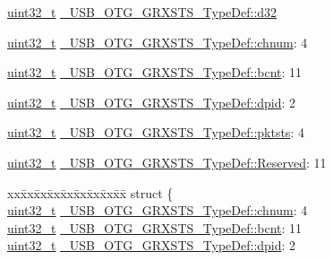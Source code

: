 \begin{DoxyCompactItemize}
\begin{tabbing}
\end{tabbing}\item 
\hyperlink{stdint_8h_a435d1572bf3f880d55459d9805097f62}{uint32\-\_\-t} \hyperlink{group___u_s_b___o_t_g___d_r_i_v_e_r_gab071a096d316aba8721b227e86994e8d}{\-\_\-\-U\-S\-B\-\_\-\-O\-T\-G\-\_\-\-G\-R\-X\-S\-T\-S\-\_\-\-Type\-Def\-::d32}
\item 
\hyperlink{stdint_8h_a435d1572bf3f880d55459d9805097f62}{uint32\-\_\-t} \hyperlink{group___u_s_b___o_t_g___d_r_i_v_e_r_gad13bf9b9a5b51b6001dc3b898a936845}{\-\_\-\-U\-S\-B\-\_\-\-O\-T\-G\-\_\-\-G\-R\-X\-S\-T\-S\-\_\-\-Type\-Def\-::chnum}\-: 4
\item 
\hyperlink{stdint_8h_a435d1572bf3f880d55459d9805097f62}{uint32\-\_\-t} \hyperlink{group___u_s_b___o_t_g___d_r_i_v_e_r_gaf3069e9e6cdea3892dc19c9b53f539a6}{\-\_\-\-U\-S\-B\-\_\-\-O\-T\-G\-\_\-\-G\-R\-X\-S\-T\-S\-\_\-\-Type\-Def\-::bcnt}\-: 11
\item 
\hyperlink{stdint_8h_a435d1572bf3f880d55459d9805097f62}{uint32\-\_\-t} \hyperlink{group___u_s_b___o_t_g___d_r_i_v_e_r_gaa694a3bd21aec4905205948d31e5576c}{\-\_\-\-U\-S\-B\-\_\-\-O\-T\-G\-\_\-\-G\-R\-X\-S\-T\-S\-\_\-\-Type\-Def\-::dpid}\-: 2
\item 
\hyperlink{stdint_8h_a435d1572bf3f880d55459d9805097f62}{uint32\-\_\-t} \hyperlink{group___u_s_b___o_t_g___d_r_i_v_e_r_ga686db23028035b8ec903aaedd0f1e3c1}{\-\_\-\-U\-S\-B\-\_\-\-O\-T\-G\-\_\-\-G\-R\-X\-S\-T\-S\-\_\-\-Type\-Def\-::pktsts}\-: 4
\item 
\hyperlink{stdint_8h_a435d1572bf3f880d55459d9805097f62}{uint32\-\_\-t} \hyperlink{group___u_s_b___o_t_g___d_r_i_v_e_r_gac6ed8ae7244e39a9103516aaa72d4437}{\-\_\-\-U\-S\-B\-\_\-\-O\-T\-G\-\_\-\-G\-R\-X\-S\-T\-S\-\_\-\-Type\-Def\-::\-Reserved}\-: 11
\item 
\begin{tabbing}
xx\=xx\=xx\=xx\=xx\=xx\=xx\=xx\=xx\=\kill
struct \{\\
\>\hyperlink{stdint_8h_a435d1572bf3f880d55459d9805097f62}{uint32\_t} \hyperlink{group___u_s_b___o_t_g___d_r_i_v_e_r_gad13bf9b9a5b51b6001dc3b898a936845}{\_USB\_OTG\_GRXSTS\_TypeDef::chnum}: 4\\
\>\hyperlink{stdint_8h_a435d1572bf3f880d55459d9805097f62}{uint32\_t} \hyperlink{group___u_s_b___o_t_g___d_r_i_v_e_r_gaf3069e9e6cdea3892dc19c9b53f539a6}{\_USB\_OTG\_GRXSTS\_TypeDef::bcnt}: 11\\
\>\hyperlink{stdint_8h_a435d1572bf3f880d55459d9805097f62}{uint32\_t} \hyperlink{group___u_s_b___o_t_g___d_r_i_v_e_r_gaa694a3bd21aec4905205948d31e5576c}{\_USB\_OTG\_GRXSTS\_TypeDef::dpid}: 2\\

\end{tabbing}
\end{DoxyCompactItemize}

